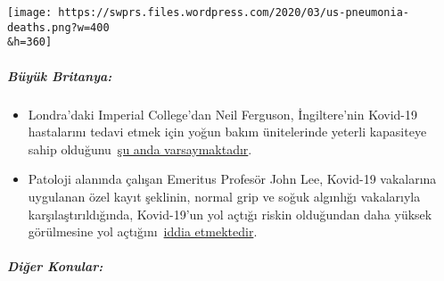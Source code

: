 \texttt{[image: https://swprs.files.wordpress.com/2020/03/us-pneumonia-deaths.png?w=400\\\&h=360]}

\hypertarget{buxfcyuxfck-britanya}{%
\subparagraph{\texorpdfstring{\textbf{Büyük
Britanya:}}{Büyük Britanya:}}\label{buxfcyuxfck-britanya}}

\begin{itemize}
\tightlist
\item
  Londra'daki Imperial College'dan Neil Ferguson, İngiltere'nin Kovid-19
  hastalarını tedavi etmek için yoğun bakım ünitelerinde yeterli
  kapasiteye sahip
  olduğunu~\href{https://www.newscientist.com/article/2238578-uk-has-enough-intensive-care-units-for-coronavirus-expert-predicts/}{şu
  anda varsaymaktadır}.
\item
  Patoloji alanında çalışan Emeritus Profesör John Lee, Kovid-19
  vakalarına uygulanan özel kayıt şeklinin, normal grip ve soğuk
  algınlığı vakalarıyla karşılaştırıldığında, Kovid-19'un yol açtığı
  riskin olduğundan daha yüksek görülmesine yol
  açtığını~\href{https://www.spectator.co.uk/article/The-evidence-on-Covid-19-is-not-as-clear-as-we-think}{iddia
  etmektedir}.
\end{itemize}

\hypertarget{diux11fer-konular}{%
\subparagraph{\texorpdfstring{\textbf{Diğer
Konular:}}{Diğer Konular:}}\label{diux11fer-konular}}

